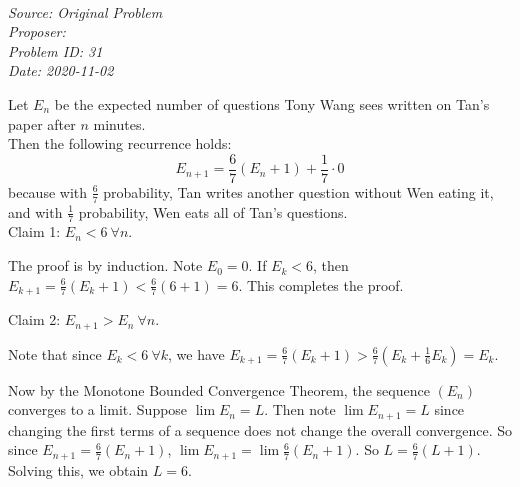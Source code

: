 \SSbreak\\ 
\emph{Source: Original Problem}\\
\emph{Proposer: \Pbfan}\\
\emph{Problem ID: 31}\\
\emph{Date: 2020-11-02}\\
\SSbreak

\bigskip 

\begin{solution}\hfil\medskip

    Let $E_n$ be the expected number of questions Tony Wang sees written on Tan's paper after $n$ minutes. \\

    Then the following recurrence holds: 
    \[E_{n+1} = \frac{6}{7} (E_n+1) + \frac{1}{7} \cdot 0\]
    because with $\frac{6}{7}$ probability, Tan writes another question without Wen eating it, and with $\frac{1}{7}$ probability, Wen eats all of Tan's questions. \\

    Claim 1: $E_n < 6 ~\forall n$. 

    \begin{subproof}
        The proof is by induction. Note $E_0 = 0$. If $E_k < 6$, then $E_{k+1} = \frac{6}{7} (E_k + 1) < \frac{6}{7} (6 + 1) = 6$. This completes the proof. 
    \end{subproof}

    Claim 2: $E_{n+1} > E_n ~\forall n$. 

    \begin{subproof}
        Note that since $E_k < 6 ~\forall k$, we have $E_{k+1} = \frac{6}{7} (E_k+1) > \frac{6}{7} (E_k + \frac16 E_k) = E_k$. 
    \end{subproof}

    Now by the Monotone Bounded Convergence Theorem, the sequence $\left( E_n \right )$ converges to a limit. Suppose $\lim E_n = L$. Then note $\lim E_{n+1} = L$ since changing the first terms of a sequence does not change the overall convergence. So since $E_{n+1} = \frac{6}{7} (E_n + 1)$, $\lim E_{n+1} = \lim \frac{6}{7} (E_n+1)$. So $L = \frac{6}{7}(L + 1)$. \\

    Solving this, we obtain $L = \boxed{6}$. 
\end{solution}\bigskip